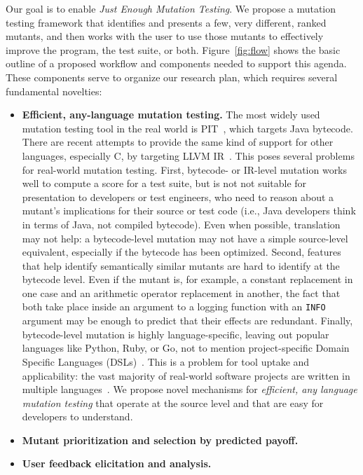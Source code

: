 Our goal is to enable \emph{Just Enough Mutation Testing}.  We propose a
mutation testing framework that identifies and presents a few, very different,
ranked mutants, and then works with the user to use those mutants to effectively
improve the program, the test suite, or both.  Figure~\ref{fig:flow}
 shows the basic outline of a proposed workflow
and components needed to support this agenda.  These components serve to
organize our research plan, which requires several fundamental novelties:
\begin{itemize}
\item \textbf{Efficient, any-language mutation testing.}  The most widely used
  mutation testing tool in the real world is PIT~\cite{pittest}, which targets
  Java bytecode.  There are recent attempts to provide the same kind of support
  for other languages, especially C, by targeting LLVM IR~\cite{HaririLLVM}.
  This poses several problems for real-world mutation testing.  First, bytecode-
  or IR-level mutation works well to compute a score for a test suite, but is
  not not suitable for presentation to developers or test engineers, who need to
  reason about a mutant's implications for their source or test code (i.e., Java
  developers think in terms of Java, not compiled bytecode).  Even when
  possible, translation may not help: a bytecode-level mutation may not have a
  simple source-level equivalent, especially if the bytecode has been optimized.
  Second, features that help identify semantically similar mutants are hard to
  identify at the bytecode level.  Even if the mutant is, for example, a
  constant replacement in one case and an arithmetic operator replacement in
  another, the fact that both take place inside an argument to a logging
  function with an {\tt INFO} argument may be enough to predict that their
  effects are redundant.  Finally, bytecode-level mutation is highly
  language-specific, leaving out popular languages like Python, Ruby, or Go, not
  to mention project-specific Domain Specific Languages (DSLs)~\cite{Fow10}.
  This is a problem for tool uptake and applicability: the vast majority of
  real-world software projects are written in multiple languages~\cite{Ray2014}.
  We propose novel mechanisms for \emph{efficient, any language mutation
    testing} that operate at the source level and that are easy for developers
  to understand. 
\item \textbf{Mutant prioritization and selection by predicted payoff.}
\item \textbf{User feedback elicitation and analysis.}
\end{itemize}

